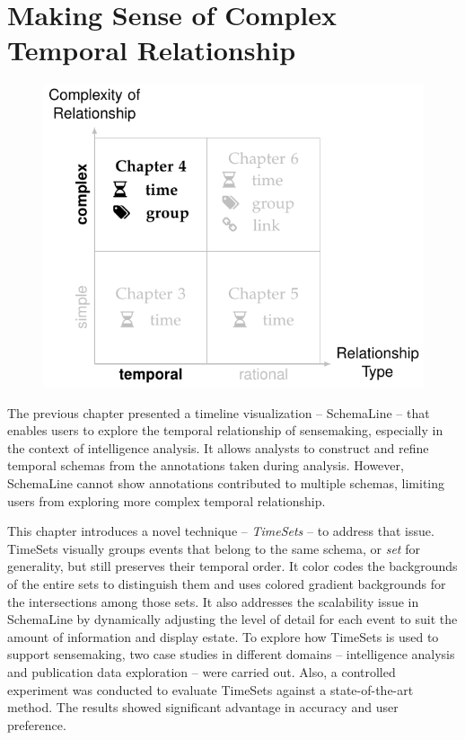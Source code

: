 \chapter{Making Sense of Complex Temporal Relationship}
\label{chap:timesets}

\graphicspath{{Chapter4/figures/}}

\begin{figure}[!htb]
	\centering
	\includegraphics{work}
\end{figure}

\vspace{.8in}


\pagebreak

The previous chapter presented a timeline visualization -- SchemaLine -- that enables users to explore the temporal relationship of sensemaking, especially in the context of intelligence analysis. It allows analysts to construct and refine temporal schemas from the annotations taken during analysis. However, SchemaLine cannot show annotations contributed to multiple schemas, limiting users from exploring more complex temporal relationship. 

This chapter introduces a novel technique -- \emph{TimeSets} -- to address that issue. TimeSets visually groups events that belong to the same schema, or \emph{set} for generality, but still preserves their temporal order. It color codes the backgrounds of the entire sets to distinguish them and uses colored gradient backgrounds for the intersections among those sets. It also addresses the scalability issue in SchemaLine by dynamically adjusting the level of detail for each event to suit the amount of information and display estate. To explore how TimeSets is used to support sensemaking, two case studies in different domains -- intelligence analysis and publication data exploration -- were carried out. Also, a controlled experiment was conducted to evaluate TimeSets against a state-of-the-art method. The results showed significant advantage in accuracy and user preference.


